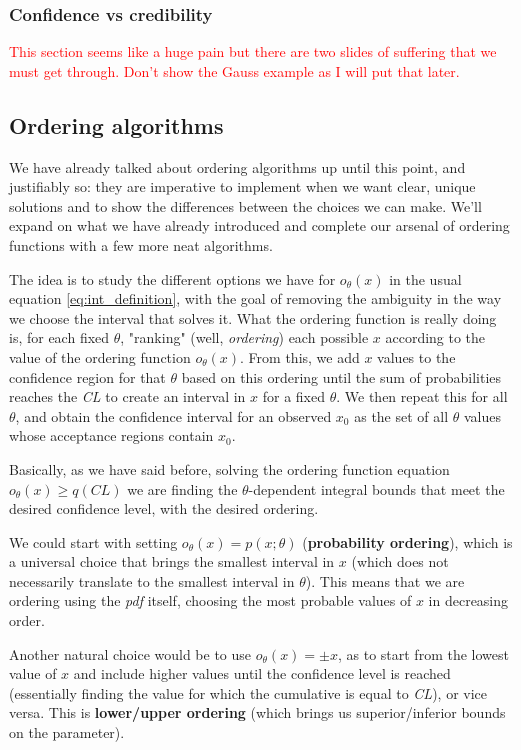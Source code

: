\subsubsection{Confidence vs credibility}
\textcolor{red}{This section seems like a huge pain but there are two slides of suffering that we must get through. Don't show the Gauss example as I will put that later.}

\subsection{Ordering algorithms}

We have already talked about ordering algorithms up until this point, and justifiably so: they are imperative to implement when we want clear, unique solutions and to show the differences between the choices we can make. We'll expand on what we have already introduced and complete our arsenal of ordering functions with a few more neat algorithms.

The idea is to study the different options we have for $o_{\theta}(x)$ in the usual equation \ref{eq:int_definition}, with the goal of removing the ambiguity in the way we choose the interval that solves it. What the ordering function is really doing is, for each fixed $\theta$, "ranking" (well, \emph{ordering}) each possible $x$ according to the value of the ordering function $o_{\theta}(x)$. From this, we add $x$ values to the confidence region for that $\theta$ based on this ordering until the sum of probabilities reaches the \emph{CL} to create an interval in $x$ for a fixed $\theta$. We then repeat this for all $\theta$, and obtain the confidence interval for an observed $x_0$ as the set of all $\theta$ values whose acceptance regions contain $x_0$.

Basically, as we have said before, solving the ordering function equation $o_{\theta}(x)\geq q(CL)$ we are finding the $\theta$-dependent integral bounds that meet the desired confidence level, with the desired ordering. 

We could start with setting $o_{\theta}(x)=p(x;\theta)$ (\textbf{probability ordering}), which is a universal choice that brings the smallest interval in $x$ (which does not necessarily translate to the smallest interval in $\theta$). This means that we are ordering using the \emph{pdf} itself, choosing the most probable values of $x$ in decreasing order.

Another natural choice would be to use $o_{\theta}(x)=\pm x$, as to start from the lowest value of $x$ and include higher values until the confidence level is reached (essentially finding the value for which the cumulative is equal to \emph{CL}), or vice versa. This is \textbf{lower/upper ordering} (which brings us superior/inferior bounds on the parameter).

